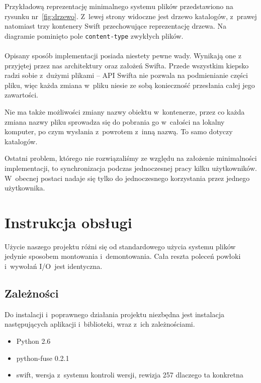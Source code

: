 Przykładową reprezentację minimalnego systemu plików przedstawiono na rysunku
nr~\ref{fig:drzewo}. Z~lewej strony widoczne jest drzewo katalogów, z~prawej
natomiast trzy kontenery Swift przechowujące reprezentację drzewa. Na diagramie
pominięto pole \texttt{content-type} zwykłych plików.

\paragraph{}
Opisany sposób implementacji posiada niestety pewne wady. Wynikają one z
przyjętej przez nas architektury oraz założeń Swifta. Przede wszystkim \cb{}
kiepsko radzi sobie z~dużymi plikami -- API Swifta nie pozwala na podmienianie
części pliku, więc każda zmiana w~pliku niesie ze sobą konieczność przesłania
całej jego zawartości.

Nie ma także możliwości zmiany nazwy obiektu w~kontenerze, przez co każda zmiana
nazwy pliku sprowadza się do pobrania go w~całości na lokalny komputer, po czym
wysłania z~powrotem z~inną nazwą. To samo dotyczy katalogów.

Ostatni problem, którego nie rozwiązaliśmy ze względu na założenie minimalności
implementacji, to synchronizacja podczas jednoczesnej pracy kilku użytkowników.
W~obecnej postaci \cb{} nadaje się tylko do jednoczesnego korzystania przez
jednego użytkownika.

\section{Instrukcja obsługi}
Użycie naszego projektu różni się od standardowego użycia systemu plików
jedynie sposobem montowania i~demontowania. Cała reszta poleceń powłoki
i~wywołań I/O~jest identyczna.

\subsection{Zależności}

Do instalacji i~poprawnego działania projektu \cb{} niezbędna jest instalacja
następujących aplikacji i~biblioteki, wraz z~ich zależnościami.

\begin{itemize}
	\item{Python 2.6}
	\item{python-fuse 0.2.1}
	\item{swift, wersja z~systemu kontroli wersji, rewizja 257 \todo dlaczego
		ta konkretna}
\end{itemize}

